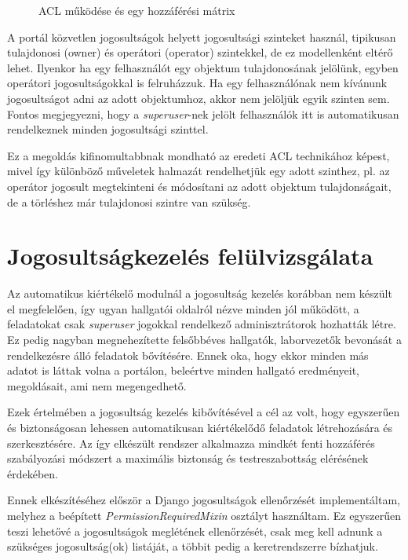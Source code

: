 \begin{figure}[h]
    \centering
    \caption{ACL működése és egy hozzáférési mátrix}
    \label{fig:acl}
\end{figure}

A portál közvetlen jogosultságok helyett jogosultsági szinteket használ, tipikusan tulajdonosi (owner) és operátori (operator) szintekkel, de ez modellenként eltérő lehet. Ilyenkor ha egy felhasználót egy objektum tulajdonosának jelölünk, egyben operátori jogosultságokkal is felruházzuk. Ha egy felhasználónak nem kívánunk jogosultságot adni az adott objektumhoz, akkor nem jelöljük egyik szinten sem. Fontos megjegyezni, hogy a \textit{superuser}-nek jelölt felhasználók itt is automatikusan rendelkeznek minden jogosultsági szinttel.

Ez a megoldás kifinomultabbnak mondható az eredeti ACL technikához képest, mivel így különböző műveletek halmazát rendelhetjük egy adott szinthez, pl. az operátor jogosult megtekinteni és módosítani az adott objektum tulajdonságait, de a törléshez már tulajdonosi szintre van szükség.

\section{Jogosultságkezelés felülvizsgálata}

Az automatikus kiértékelő modulnál a jogosultság kezelés korábban nem készült el megfelelően, így ugyan hallgatói oldalról nézve minden jól működött, a feladatokat csak \textit{superuser} jogokkal rendelkező adminisztrátorok hozhatták létre. Ez pedig nagyban megnehezítette felsőbbéves hallgatók, laborvezetők bevonását a rendelkezésre álló feladatok bővítésére. Ennek oka, hogy ekkor minden más adatot is láttak volna a portálon, beleértve minden hallgató eredményeit, megoldásait, ami nem megengedhető.

Ezek értelmében a jogosultság kezelés kibővítésével a cél az volt, hogy egyszerűen és biztonságosan lehessen automatikusan kiértékelődő feladatok létrehozására és szerkesztésére. Az így elkészült rendszer alkalmazza mindkét fenti hozzáférés szabályozási módszert a maximális biztonság és testreszabottság elérésének érdekében.

Ennek elkészítéséhez először a Django jogosultságok ellenőrzését implementáltam, melyhez a beépített \textit{PermissionRequiredMixin} osztályt használtam. Ez egyszerűen teszi lehetővé a jogosultságok meglétének ellenőrzését, csak meg kell adnunk a szükséges jogosultság(ok) listáját, a többit pedig a keretrendszerre bízhatjuk. \cite{DjangoPermissionMixin}

